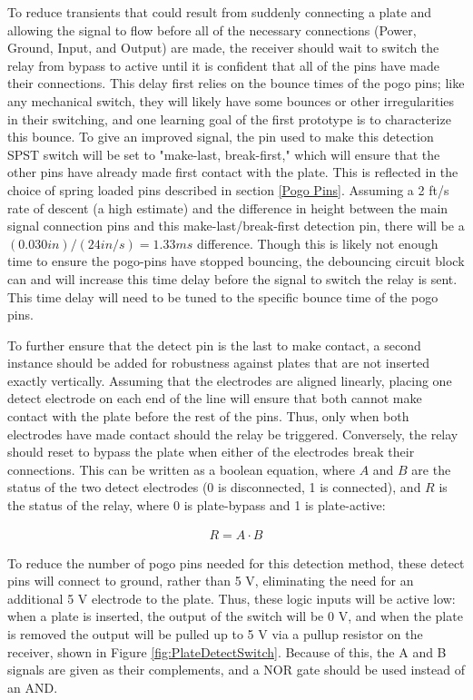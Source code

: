 \documentclass{article}
\begin{document}
		To reduce transients that could result from suddenly connecting a plate and allowing the signal to flow before all of the necessary connections (Power, Ground, Input, and Output) are made, the receiver should wait to switch the relay from bypass to active until it is confident that all of the pins have made their connections.  This delay first relies on the bounce times of the pogo pins; like any mechanical switch, they will likely have some bounces or other irregularities in their switching, and one learning goal of the first prototype is to characterize this bounce.  To give an improved signal, the pin used to make this detection SPST switch will be set to "make-last, break-first," which will ensure that the other pins have already made first contact with the plate.  This is reflected in the choice of spring loaded pins described in section \ref{Pogo Pins}.  Assuming a 2 ft/s rate of descent (a high estimate) and the difference in height between the main signal connection pins and this make-last/break-first detection pin, there will be a $(0.030 in)/(24 in/s) = 1.33 ms$ difference.  Though this is likely not enough time to ensure the pogo-pins have stopped bouncing, the debouncing circuit block can and will increase this time delay before the signal to switch the relay is sent.  This time delay will need to be tuned to the specific bounce time of the pogo pins.

		To further ensure that the detect pin is the last to make contact, a second instance should be added for robustness against plates that are not inserted exactly vertically.  Assuming that the electrodes are aligned linearly, placing one detect electrode on each end of the line will ensure that both cannot make contact with the plate before the rest of the pins.  Thus, only when both electrodes have made contact should the relay be triggered.  Conversely, the relay should reset to bypass the plate when either of the electrodes break their connections.  This can be written as a boolean equation, where $A$ and $B$ are the status of the two detect electrodes (0 is disconnected, 1 is connected), and $R$ is the status of the relay, where 0 is plate-bypass and 1 is plate-active:

		\begin{align}
			R = A \cdot B
		\end{align}

		To reduce the number of pogo pins needed for this detection method, these detect pins will connect to ground, rather than 5 V, eliminating the need for an additional 5 V electrode to the plate.  Thus, these logic inputs will be active low: when a plate is inserted, the output of the switch will be 0 V, and when the plate is removed the output will be pulled up to 5 V via a pullup resistor on the receiver, shown in Figure \ref{fig:PlateDetectSwitch}.  Because of this, the A and B signals are given as their complements, and a NOR gate should be used instead of an AND.  
\end{document}
